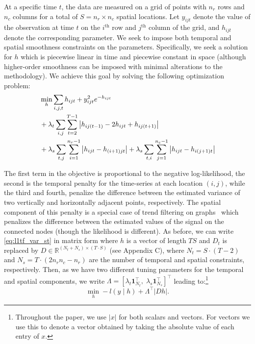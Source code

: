 \documentclass[letterpaper]{article} %
\newcommand{\one}{\mathbf{1}}
\newcommand{\given}{\;\vert\;}
\begin{document}
At a specific time $t$, the data are measured on a grid of points with
$n_r$ rows and $n_c$ columns for a total of $S=n_r\times n_c$ spatial
locations. Let $y_{ijt}$ denote the value of the 
observation at time $t$ on the $i^\text{th}$ row and $j^\text{th}$
column of the grid, and $h_{ijt}$ denote the corresponding
parameter. We seek to impose both temporal and spatial smoothness 
constraints on the parameters. Specifically, we seek a solution
for $h$ which is piecewise linear in time and piecewise constant in
space (although higher-order smoothness can be imposed with minimal
alterations to the methodology). We achieve this goal
by solving the following optimization problem: 
{\small
\begin{align}
  &\min_h \sum_{i,j,t}h_{ijt}+y_{ijt}^2e^{-h_{ijt}}\notag\\
  & +\lambda_t \sum_{i,j} \sum_{t=2}^{T-1}
    \left|h_{ij(t-1)}-2h_{ijt}+h_{ij(t+1)}\right|\label{eq:l1tf_var_st}\\ 
  &+\lambda_s \sum_{t,j} \sum_{i=1}^{n_r-1} \left|h_{ijt}-h_{(i+1)jt}\right|
    +\lambda_s \sum_{t,i} \sum_{j=1}^{n_c-1}
    \left|h_{ijt}-h_{i(j+1)t}\right|\notag
\end{align}
}%

The first term in the objective is proportional to the negative
log-likelihood, the second is the temporal penalty for the
time-series at each location $(i,j)$, while the third and fourth,
penalize the difference between the estimated variance of two
vertically and horizontally adjacent points, respectively. The spatial
component of this
penalty is a special case of trend filtering on
graphs~\cite{WangSharpnack2016} which penalizes the difference between
the estimated values of the signal on the connected nodes (though the
likelihood is different). As before,
we can write \eqref{eq:l1tf_var_st} in matrix form where $h$ is a
vector of length
$TS$ and $D_t$ is replaced by $D \in
\mathbb{R}^{(N_t+N_s) \times (T \cdot S)	}$ (see Appendix C), where $N_t=S \cdot
(T-2)$ and $N_s=T \cdot (2n_rn_c-n_r)$ are the number of temporal and
spatial constraints, respectively. 
Then, as we have two different tuning parameters
for the temporal and spatial components, we write $\Lambda
=\left[\lambda_t\one_{N_t}^\top,\;
  \lambda_s\one_{N_s}^\top\right]^\top$ leading
to:\footnote{Throughout the paper, we use $|x|$ for both scalars and
  vectors. For vectors we use this to denote a vector obtained by
  taking the absolute value of each entry of $x$.}  
\begin{equation}
\min_h -l(y\given h)+ \Lambda^\top | Dh |.
\label{eq:l1tf_var_st_mat}
\end{equation}
\end{document}
